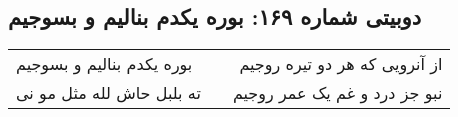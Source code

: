 \begin{center}
\section*{دوبیتی شماره ۱۶۹: بوره یکدم بنالیم و بسوجیم}
\label{sec:169}
\begin{longtable}{l p{0.5cm} r}
بوره یکدم بنالیم و بسوجیم
&&
از آنرویی که هر دو تیره روجیم
\\
ته بلبل حاش لله مثل مو نی
&&
نبو جز درد و غم یک عمر روجیم
\\
\end{longtable}
\end{center}
